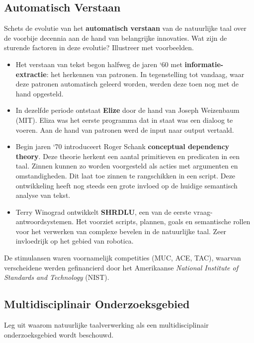 \documentclass[../main.tex]{subfiles}
\begin{document}
\subsection{Automatisch Verstaan}
\begin{question}
Schets de evolutie van het \textbf{automatisch verstaan} van de natuurlijke taal over de voorbije decennia aan de hand van belangrijke innovaties.
Wat zijn de sturende factoren in deze evolutie?
Illustreer met voorbeelden.
\end{question}

\begin{solution}
\begin{itemize}
	\item Het verstaan van tekst begon halfweg de jaren `60 met \textbf{informatie-extractie}: het herkennen van patronen. In tegenstelling tot vandaag, waar deze patronen automatisch geleerd worden, werden deze toen nog met de hand opgesteld.
	\item In dezelfde periode ontstaat \textbf{Elize} door de hand van Joseph Weizenbaum (MIT). Eliza was het eerste  programma dat in staat was een dialoog te voeren. Aan de hand van patronen werd de input naar output vertaald.
	\item Begin jaren `70 introduceert Roger Schank \textbf{conceptual dependency theory}. Deze theorie herkent een aantal primitieven en predicaten in een taal. Zinnen kunnen zo worden voorgesteld als acties met argumenten en omstandigheden. Dit laat toe zinnen te rangschikken in een script. Deze ontwikkeling heeft nog steeds een grote invloed op de huidige semantisch analyse van tekst.
	\item Terry Winograd ontwikkelt \textbf{SHRDLU}, een van de eerste vraag-antwoordsystemen. Het voorziet scripts, plannen, goals en semantische rollen voor het verwerken van complexe bevelen in de natuurlijke taal. Zeer invloedrijk op het gebied van robotica.
\end{itemize}
De stimulansen waren voornamelijk competities (MUC, ACE, TAC), waarvan verscheidene werden gefinancierd door het Amerikaanse \emph{National Institute of Standards and Technology} (NIST).
\end{solution}

\subsection{Multidisciplinair Onderzoeksgebied}
\begin{question}
Leg uit waarom natuurlijke taalverwerking als een multidisciplinair onderzoeksgebied wordt beschouwd.
\end{question}
\end{document}
